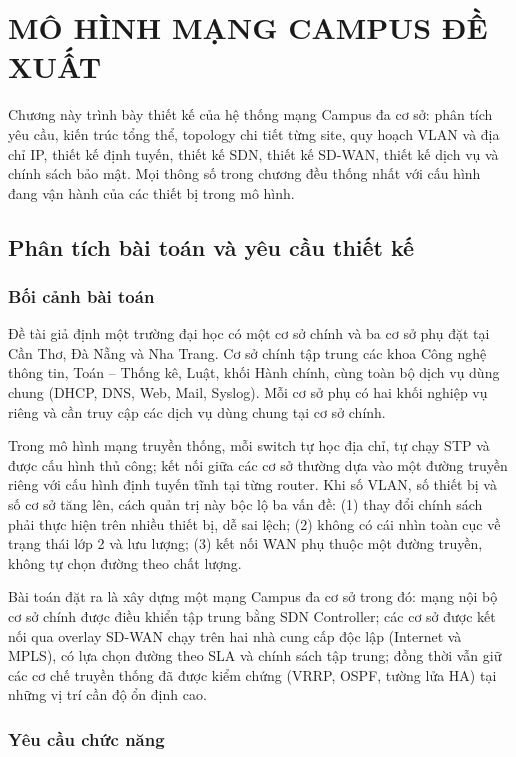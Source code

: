 \section{MÔ HÌNH MẠNG CAMPUS ĐỀ XUẤT}\label{sec:mo_hinh_de_xuat}

Chương này trình bày thiết kế của hệ thống mạng Campus đa cơ sở: phân tích yêu cầu, kiến trúc tổng thể, topology chi tiết từng site, quy hoạch VLAN và địa chỉ IP, thiết kế định tuyến, thiết kế SDN, thiết kế SD-WAN, thiết kế dịch vụ và chính sách bảo mật. Mọi thông số trong chương đều thống nhất với cấu hình đang vận hành của các thiết bị trong mô hình.

\subsection{Phân tích bài toán và yêu cầu thiết kế}

\subsubsection{Bối cảnh bài toán}

Đề tài giả định một trường đại học có một cơ sở chính và ba cơ sở phụ đặt tại Cần Thơ, Đà Nẵng và Nha Trang. Cơ sở chính tập trung các khoa Công nghệ thông tin, Toán -- Thống kê, Luật, khối Hành chính, cùng toàn bộ dịch vụ dùng chung (DHCP, DNS, Web, Mail, Syslog). Mỗi cơ sở phụ có hai khối nghiệp vụ riêng và cần truy cập các dịch vụ dùng chung tại cơ sở chính.

Trong mô hình mạng truyền thống, mỗi switch tự học địa chỉ, tự chạy STP và được cấu hình thủ công; kết nối giữa các cơ sở thường dựa vào một đường truyền riêng với cấu hình định tuyến tĩnh tại từng router. Khi số VLAN, số thiết bị và số cơ sở tăng lên, cách quản trị này bộc lộ ba vấn đề: (1) thay đổi chính sách phải thực hiện trên nhiều thiết bị, dễ sai lệch; (2) không có cái nhìn toàn cục về trạng thái lớp 2 và lưu lượng; (3) kết nối WAN phụ thuộc một đường truyền, không tự chọn đường theo chất lượng.

Bài toán đặt ra là xây dựng một mạng Campus đa cơ sở trong đó: mạng nội bộ cơ sở chính được điều khiển tập trung bằng SDN Controller; các cơ sở được kết nối qua overlay SD-WAN chạy trên hai nhà cung cấp độc lập (Internet và MPLS), có lựa chọn đường theo SLA và chính sách tập trung; đồng thời vẫn giữ các cơ chế truyền thống đã được kiểm chứng (VRRP, OSPF, tường lửa HA) tại những vị trí cần độ ổn định cao.

\subsubsection{Yêu cầu chức năng}

